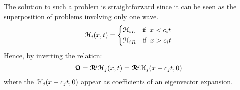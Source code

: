The solution to such a problem is straightforward since it can be seen as the superposition of problems involving only one wave.
\begin{equation*}
  \Hc_i(x,t)=\left\lbrace
    \begin{aligned}
      & {\Hc_i}_L \quad \text{if } \:x <c_i t\\
      & {\Hc_i}_R \quad \text{if } \:x>c_i t
    \end{aligned}
  \right. %
\end{equation*}
Hence, by inverting the relation:
\begin{equation*}
  {\boldsymbol{\mathcal{Q}}} = {\boldsymbol{\mathcal{R}}}^j \mathcal{H}_j(x,t) = {\boldsymbol{\mathcal{R}}}^j\mathcal{H}_j(x-c_jt,0)
\end{equation*}
where the $\mathcal{H}_j(x-c_jt,0)$ appear as coefficients of an eigenvector expansion.

